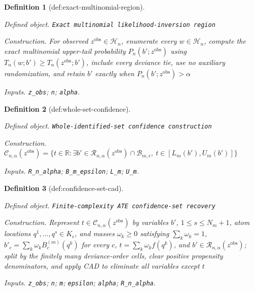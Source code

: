 \documentclass{article}
\newtheorem{definition}{Definition}
\begin{document}
\begin{definition}[def:exact-multinomial-region]\label{def:exact-multinomial-region}
\par\smallskip\noindent\emph{Defined object.} \texttt{Exact multinomial likelihood-\allowbreak{}inversion region}
\par\smallskip\noindent\emph{Construction.} For observed \(z^{\mathrm{obs}}\in\mathcal H_n\), enumerate every \(w\in\mathcal H_n\), compute the exact multinomial upper-tail probability \(P_n(b';z^{\mathrm{obs}})\) using \(T_n(w;b')\ge T_n(z^{\mathrm{obs}};b')\), include every deviance tie, use no auxiliary randomization, and retain \(b'\) exactly when \(P_n(b';z^{\mathrm{obs}})>\alpha\)
\par\smallskip\noindent\emph{Inputs.} \texttt{z\_\allowbreak{}obs}; \texttt{n}; \texttt{alpha}.
\end{definition}

\begin{definition}[def:whole-set-confidence]\label{def:whole-set-confidence}
\par\smallskip\noindent\emph{Defined object.} \texttt{Whole-\allowbreak{}identified-\allowbreak{}set confidence construction}
\par\smallskip\noindent\emph{Construction.} \(\mathcal C_{n,\alpha}(z^{\mathrm{obs}})=\{t\in\mathbb R:\exists b'\in\mathcal R_{n,\alpha}(z^{\mathrm{obs}})\cap\mathcal B_{m,\epsilon},\ t\in[L_m(b'),U_m(b')]\}\)
\par\smallskip\noindent\emph{Inputs.} \texttt{R\_\allowbreak{}n\_\allowbreak{}alpha}; \texttt{B\_\allowbreak{}m\_\allowbreak{}epsilon}; \texttt{L\_\allowbreak{}m}; \texttt{U\_\allowbreak{}m}.
\end{definition}

\begin{definition}[def:confidence-set-cad]\label{def:confidence-set-cad}
\par\smallskip\noindent\emph{Defined object.} \texttt{Finite-\allowbreak{}complexity ATE confidence-\allowbreak{}set recovery}
\par\smallskip\noindent\emph{Construction.} Represent \(t\in\mathcal C_{n,\alpha}(z^{\mathrm{obs}})\) by variables \(b'\), \(1\le s\le N_m+1\), atom locations \(q^1,\ldots,q^s\in K_{\epsilon}\), and masses \(\omega_k\ge0\) satisfying \(\sum_k\omega_k=1\), \(b'_c=\sum_k\omega_kB_c^{(m)}(q^k)\) for every \(c\), \(t=\sum_k\omega_k f(q^k)\), and \(b'\in\mathcal R_{n,\alpha}(z^{\mathrm{obs}})\); split by the finitely many deviance-order cells, clear positive propensity denominators, and apply CAD to eliminate all variables except \(t\)
\par\smallskip\noindent\emph{Inputs.} \texttt{z\_\allowbreak{}obs}; \texttt{n}; \texttt{m}; \texttt{epsilon}; \texttt{alpha}; \texttt{R\_\allowbreak{}n\_\allowbreak{}alpha}.
\end{definition}
\end{document}
